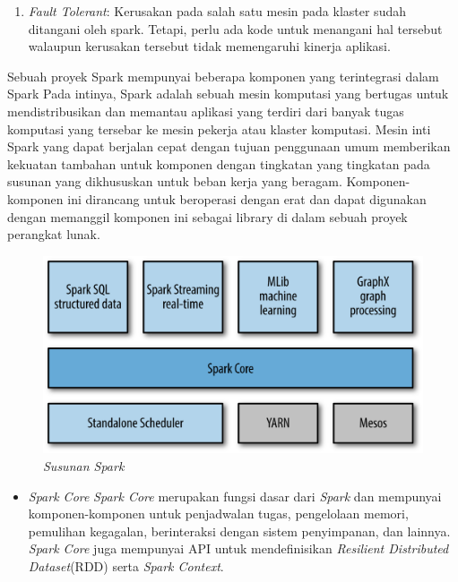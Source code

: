 \documentclass[a4paper,twoside]{article}
\begin{document}
\begin{enumerate}
{\begin{enumerate}
			\item{\textit{Fault Tolerant}: Kerusakan pada salah satu mesin pada klaster sudah 						ditangani oleh spark. Tetapi, perlu ada kode untuk menangani hal tersebut walaupun 						kerusakan tersebut tidak memengaruhi kinerja aplikasi.}
	
		\end{enumerate}	
		
		Sebuah proyek Spark mempunyai beberapa komponen yang terintegrasi dalam Spark Pada intinya, 			Spark adalah sebuah mesin komputasi yang bertugas untuk mendistribusikan dan memantau 					aplikasi yang terdiri dari banyak tugas komputasi yang tersebar  ke mesin pekerja atau 					klaster komputasi. Mesin inti Spark yang dapat berjalan cepat dengan tujuan penggunaan umum 			memberikan kekuatan tambahan untuk komponen dengan tingkatan yang tingkatan pada susunan 				yang dikhususkan untuk beban kerja yang beragam. Komponen-komponen ini dirancang untuk 					beroperasi dengan erat dan dapat digunakan dengan memanggil komponen ini sebagai library di 			dalam sebuah proyek perangkat lunak.

		\begin{figure}[H] 
		\centering  
		\includegraphics[scale=1]{spark-core}  
		\caption[Gambar { \it Spark unified stack}]{{\it Susunan Spark}} 
		\label{fig:processing-events relationship} 
		\end{figure}	
		
		}
		
	\begin{itemize}
		\item{\textit{Spark Core} \textit{Spark Core} merupakan fungsi dasar dari \textit{Spark} 				dan mempunyai komponen-komponen untuk penjadwalan tugas, pengelolaan memori, pemulihan 					kegagalan, berinteraksi dengan sistem penyimpanan, dan lainnya. \textit{Spark Core} juga 				mempunyai API untuk mendefinisikan \textit{Resilient Distributed Dataset}(RDD) serta 					\textit{Spark Context}.}
	

\end{itemize}
\end{enumerate}
\end{document}

